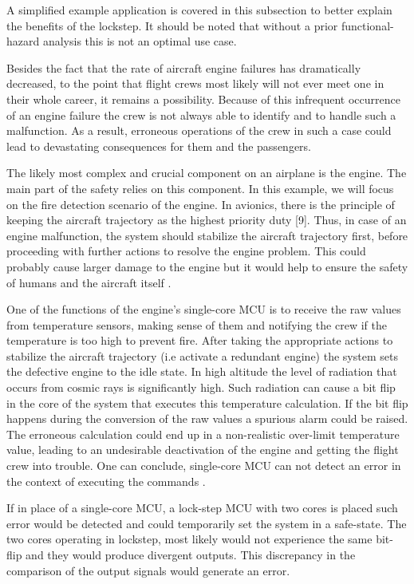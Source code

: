 A simplified example application is covered in this subsection to better explain the benefits of the lockstep. It should be noted that without a prior functional-hazard analysis this is not an optimal use case.

Besides the fact that the rate of aircraft engine failures has dramatically decreased,
to the point that flight crews most likely will not ever meet one in their
whole career, it remains a possibility. Because of this infrequent occurrence
of an engine failure the crew is not always able to identify and to handle such a
malfunction. As a result, erroneous operations of the crew in such a case could
lead to devastating consequences for them and the passengers.

The likely most complex and crucial component on an airplane is the engine. The main part of the safety relies on this component. In this example, we will focus on the fire detection scenario of the engine. 
In avionics, there is the principle of keeping the aircraft trajectory as
the highest priority duty [9]. Thus, in case of an engine malfunction, the system
should stabilize the aircraft trajectory first, before proceeding with further actions
to resolve the engine problem. This could probably cause larger damage to the
engine but it would help to ensure the safety of humans and the aircraft itself  \citep{lockstep_analysis}.

One of the functions of the engine's single-core MCU is to receive the raw values from temperature sensors, making sense of them and notifying the crew if the temperature is too high to prevent fire.  
After taking the appropriate actions to stabilize the aircraft trajectory (i.e activate a redundant engine) the system sets the defective engine to the idle state. In high
altitude the level of radiation that occurs from cosmic rays is significantly high.
Such radiation can cause a bit flip in the core of the
system that executes this temperature calculation. If the bit flip happens during the conversion of the raw values a spurious alarm could be raised. The erroneous calculation could end up in a non-realistic
over-limit temperature value, leading to an undesirable deactivation of the engine
and getting the flight crew into trouble. One can conclude, single-core MCU can not detect an error in the context of executing the commands  \citep{lockstep_analysis}.

If in place of a single-core MCU, a lock-step MCU with two cores is placed such error would be detected and could temporarily set the system in a safe-state. The
two cores operating in lockstep, most likely would not experience the same bit-flip
and they would produce divergent outputs. This discrepancy in the comparison of
the output signals would generate an error.


